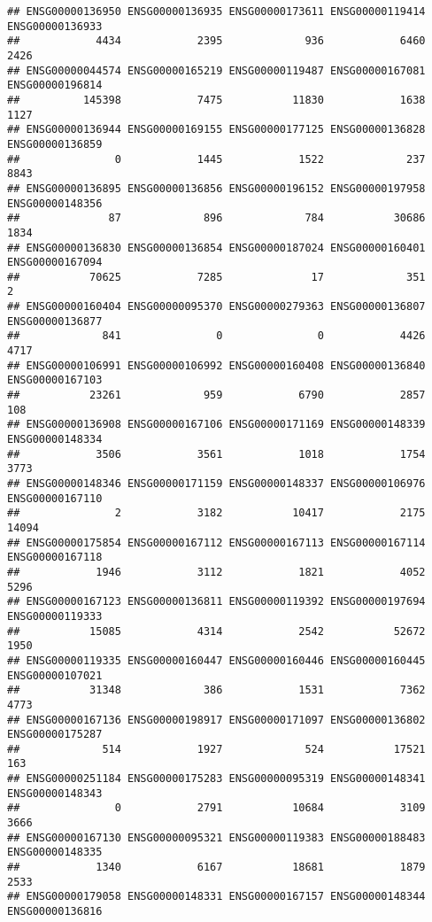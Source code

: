 \documentclass[
]{article}
\begin{document}
\begin{verbatim}
## ENSG00000136950 ENSG00000136935 ENSG00000173611 ENSG00000119414 ENSG00000136933 
##            4434            2395             936            6460            2426 
## ENSG00000044574 ENSG00000165219 ENSG00000119487 ENSG00000167081 ENSG00000196814 
##          145398            7475           11830            1638            1127 
## ENSG00000136944 ENSG00000169155 ENSG00000177125 ENSG00000136828 ENSG00000136859 
##               0            1445            1522             237            8843 
## ENSG00000136895 ENSG00000136856 ENSG00000196152 ENSG00000197958 ENSG00000148356 
##              87             896             784           30686            1834 
## ENSG00000136830 ENSG00000136854 ENSG00000187024 ENSG00000160401 ENSG00000167094 
##           70625            7285              17             351               2 
## ENSG00000160404 ENSG00000095370 ENSG00000279363 ENSG00000136807 ENSG00000136877 
##             841               0               0            4426            4717 
## ENSG00000106991 ENSG00000106992 ENSG00000160408 ENSG00000136840 ENSG00000167103 
##           23261             959            6790            2857             108 
## ENSG00000136908 ENSG00000167106 ENSG00000171169 ENSG00000148339 ENSG00000148334 
##            3506            3561            1018            1754            3773 
## ENSG00000148346 ENSG00000171159 ENSG00000148337 ENSG00000106976 ENSG00000167110 
##               2            3182           10417            2175           14094 
## ENSG00000175854 ENSG00000167112 ENSG00000167113 ENSG00000167114 ENSG00000167118 
##            1946            3112            1821            4052            5296 
## ENSG00000167123 ENSG00000136811 ENSG00000119392 ENSG00000197694 ENSG00000119333 
##           15085            4314            2542           52672            1950 
## ENSG00000119335 ENSG00000160447 ENSG00000160446 ENSG00000160445 ENSG00000107021 
##           31348             386            1531            7362            4773 
## ENSG00000167136 ENSG00000198917 ENSG00000171097 ENSG00000136802 ENSG00000175287 
##             514            1927             524           17521             163 
## ENSG00000251184 ENSG00000175283 ENSG00000095319 ENSG00000148341 ENSG00000148343 
##               0            2791           10684            3109            3666 
## ENSG00000167130 ENSG00000095321 ENSG00000119383 ENSG00000188483 ENSG00000148335 
##            1340            6167           18681            1879            2533 
## ENSG00000179058 ENSG00000148331 ENSG00000167157 ENSG00000148344 ENSG00000136816 

\end{verbatim}
\end{document}
